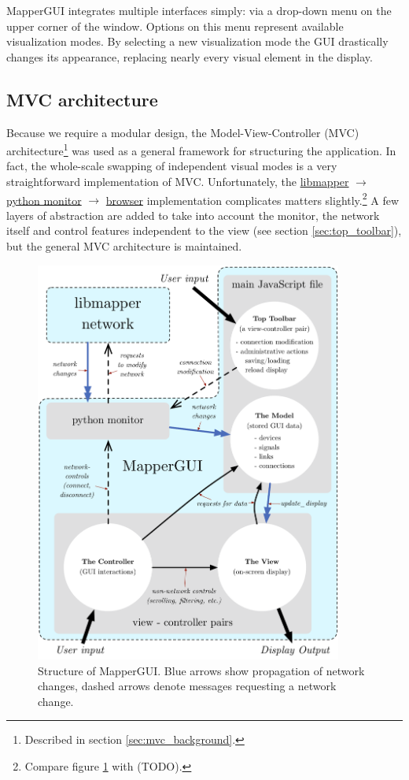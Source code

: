 MapperGUI integrates multiple interfaces simply: via a drop-down menu on the upper corner of the window. Options on this menu represent available visualization modes. By selecting a new visualization mode the GUI drastically changes its appearance, replacing nearly every visual element in the display.

	\subsection{MVC architecture} %
	\label{sec:mvc_architecture}

Because we require a modular design, the Model-View-Controller (MVC) architecture\footnote{Described in section \ref{sec:mvc_background}.} was used as a general framework for structuring the application. In fact, the whole-scale swapping of independent visual modes is a very straightforward implementation of MVC. Unfortunately, the \url{libmapper} $\rightarrow$ \url{python monitor} $\rightarrow$ \url{browser} implementation complicates matters slightly.\footnote{Compare figure \ref{fig:mapper_network} with (TODO).} A few layers of abstraction are added to take into account the monitor, the network itself and control features independent to the view (see section \ref{sec:top_toolbar}), but the general MVC architecture is maintained.

\begin{figure}
\centering
	\includegraphics[width=0.9\textwidth]{figures/mapper_network}
\caption{Structure of MapperGUI. Blue arrows show propagation of network changes, dashed arrows denote messages requesting a network change.}
\label{fig:mapper_network}
\end{figure}


